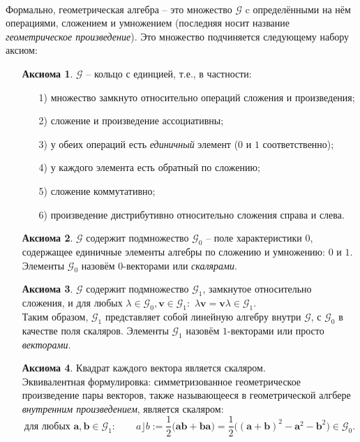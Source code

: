 \documentclass[12pt]{article}
\begin{document}
\paragraph{}
Формально, геометрическая алгебра -- это множество $\mathcal{G}$ c определёнными на нём операциями, сложением и умножением (последняя носит название \textit{геометрическое произведение}). Это множество подчиняется следующему набору аксиом:
\begin{enumerate}
    \item[]\textbf{Аксиома 1}. $\mathcal{G}$ -- кольцо с единцией, т.е., в частности:
        \begin{enumerate}
            \item[1)] множество замкнуто относительно операций сложения и произведения;
            \item[2)] сложение и произведение ассоциативны;
            \item[3)] у обеих операций есть \textit{единичный} элемент ($0$ и $1$ соответственно);
            \item[4)] у каждого элемента есть обратный по сложению;
            \item[5)] сложение коммутативно;
            \item[6)] произведение дистрибутивно относительно сложения справа и слева.
        \end{enumerate}
        
    \item[]\textbf{Аксиома 2}. $\mathcal{G}$ содержит подмножество $\mathcal{G}_0$ -- поле характеристики $0$, содержащее единичные элементы алгебры по сложению и умножению: $0$ и $1$. \\Элементы $\mathcal{G}_0$ назовём $0$-векторами или \textit{скалярами}.
    
    \item[]\textbf{Аксиома 3}. $\mathcal{G}$ содержит подмножество $\mathcal{G}_1$, замкнутое относительно сложения, и для любых $\lambda \in \mathcal{G}_0, \mathbf{v}\in \mathcal{G}_1:$ $\lambda \mathbf{v} =  \mathbf{v} \lambda  \in \mathcal{G}_1$. \\ Таким образом, $\mathcal{G}_1$ представляет собой линейную алгебру внутри $\mathcal{G}$, с $\mathcal{G}_0$ в качестве поля скаляров. Элементы $\mathcal{G}_1$ назовём $1$-векторами или просто \textit{векторами}.
    
    \item[]\textbf{Аксиома 4}. Квадрат каждого вектора является скаляром.\\
    Эквивалентная формулировка: симметризованное геометрическое произведение пары векторов, также называющееся в геометрической алгбере \textit{внутренним произведением}, является скаляром:
    $$\text{для любых } \mathbf{a},\mathbf{b} \in \mathcal{G}_1: \quad \quad a \rfloor b :=  \frac{1}{2}\big( \mathbf{a}\mathbf{b} + \mathbf{b}\mathbf{a}\big) = \frac{1}{2}\big( (\mathbf{a} + \mathbf{b})^2 - \mathbf{a}^2 - \mathbf{b}^2 \big) \in \mathcal{G}_0.$$
    

\end{enumerate}
\end{document}
